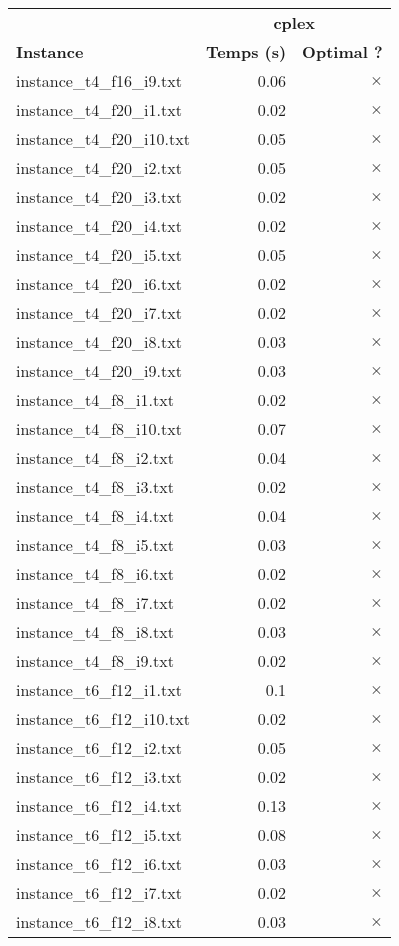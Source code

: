 \documentclass{article}
\begin{document}
\newpage
\begin{center}
\renewcommand{\arraystretch}{1.4} 
\begin{tabular}{lrr}
	\hline
 & \multicolumn{2}{c}{\textbf{cplex}}\\
\textbf{Instance}  & \textbf{Temps (s)} & \textbf{Optimal ?} \\\hline

instance\_t4\_f16\_i9.txt & 0.06 & 
$\times$
\\
instance\_t4\_f20\_i1.txt & 0.02 & 
$\times$
\\
instance\_t4\_f20\_i10.txt & 0.05 & 
$\times$
\\
instance\_t4\_f20\_i2.txt & 0.05 & 
$\times$
\\
instance\_t4\_f20\_i3.txt & 0.02 & 
$\times$
\\
instance\_t4\_f20\_i4.txt & 0.02 & 
$\times$
\\
instance\_t4\_f20\_i5.txt & 0.05 & 
$\times$
\\
instance\_t4\_f20\_i6.txt & 0.02 & 
$\times$
\\
instance\_t4\_f20\_i7.txt & 0.02 & 
$\times$
\\
instance\_t4\_f20\_i8.txt & 0.03 & 
$\times$
\\
instance\_t4\_f20\_i9.txt & 0.03 & 
$\times$
\\
instance\_t4\_f8\_i1.txt & 0.02 & 
$\times$
\\
instance\_t4\_f8\_i10.txt & 0.07 & 
$\times$
\\
instance\_t4\_f8\_i2.txt & 0.04 & 
$\times$
\\
instance\_t4\_f8\_i3.txt & 0.02 & 
$\times$
\\
instance\_t4\_f8\_i4.txt & 0.04 & 
$\times$
\\
instance\_t4\_f8\_i5.txt & 0.03 & 
$\times$
\\
instance\_t4\_f8\_i6.txt & 0.02 & 
$\times$
\\
instance\_t4\_f8\_i7.txt & 0.02 & 
$\times$
\\
instance\_t4\_f8\_i8.txt & 0.03 & 
$\times$
\\
instance\_t4\_f8\_i9.txt & 0.02 & 
$\times$
\\
instance\_t6\_f12\_i1.txt & 0.1 & 
$\times$
\\
instance\_t6\_f12\_i10.txt & 0.02 & 
$\times$
\\
instance\_t6\_f12\_i2.txt & 0.05 & 
$\times$
\\
instance\_t6\_f12\_i3.txt & 0.02 & 
$\times$
\\
instance\_t6\_f12\_i4.txt & 0.13 & 
$\times$
\\
instance\_t6\_f12\_i5.txt & 0.08 & 
$\times$
\\
instance\_t6\_f12\_i6.txt & 0.03 & 
$\times$
\\
instance\_t6\_f12\_i7.txt & 0.02 & 
$\times$
\\
instance\_t6\_f12\_i8.txt & 0.03 & 
$\times$
\\
\hline\end{tabular}
\end{center}
\end{document}
